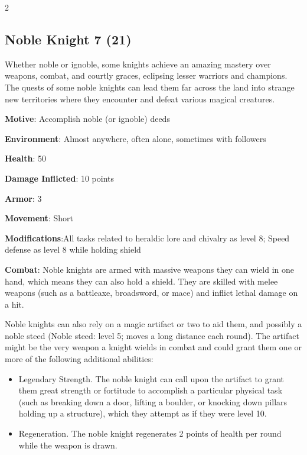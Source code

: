 \begin{multicols}{2}
\subsection{Noble Knight 7 (21)}

Whether noble or ignoble, some knights achieve an amazing mastery over weapons, combat, and courtly graces, eclipsing lesser warriors and champions. The quests of some noble knights can lead them far across the land into strange new territories where they encounter and defeat various magical creatures. 

\textbf{Motive}: Accomplish noble (or ignoble) deeds 

\textbf{Environment}: Almost anywhere, often alone, sometimes with followers 

\textbf{Health}: 50 

\textbf{Damage Inflicted}: 10 points 

\textbf{Armor}: 3 

\textbf{Movement}: Short 

\textbf{Modifications}:All tasks related to heraldic lore and chivalry as level 8; Speed defense as level 8 while holding shield 

\textbf{Combat}: Noble knights are armed with massive weapons they can wield in one hand, which means they can also hold a shield. They are skilled with melee weapons (such as a battleaxe, broadsword, or mace) and inflict lethal damage on a hit. 

Noble knights can also rely on a magic artifact or two to aid them, and possibly a noble steed (Noble steed: level 5; moves a long distance each round). The artifact might be the very weapon a knight wields in combat and could grant them one or more of the following additional abilities: 

\begin{itemize} 
\item Legendary Strength. The noble knight can call upon the artifact to grant them great strength or fortitude to accomplish a particular physical task (such as breaking down a door, lifting a boulder, or knocking down pillars holding up a structure), which they attempt as if they were level 10. 

\item Regeneration. The noble knight regenerates 2 points of health per round while the weapon is drawn. 


\end{itemize}
\end{multicols}
